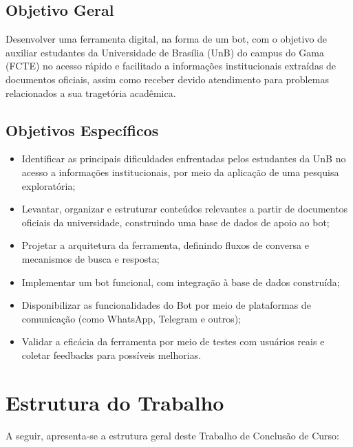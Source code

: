 \subsection{Objetivo Geral}

Desenvolver uma ferramenta digital, na forma de um bot, com o objetivo de auxiliar estudantes da Universidade de Brasília (UnB) do campus do Gama (FCTE) no acesso rápido e facilitado a informações institucionais extraídas de documentos oficiais, assim como receber devido atendimento para problemas relacionados a sua tragetória acadêmica.

\subsection{Objetivos Específicos}

\begin{itemize}
    \item Identificar as principais dificuldades enfrentadas pelos estudantes da UnB no acesso a informações institucionais, por meio da aplicação de uma pesquisa exploratória;
    
    \item Levantar, organizar e estruturar conteúdos relevantes a partir de documentos oficiais da universidade, construindo uma base de dados de apoio ao bot;
    
    \item Projetar a arquitetura da ferramenta, definindo fluxos de conversa e mecanismos de busca e resposta;
    
    \item Implementar um bot funcional, com integração à base de dados construída;
    
    \item Disponibilizar as funcionalidades do Bot por meio de plataformas de comunicação (como WhatsApp, Telegram e outros);
    
    \item Validar a eficácia da ferramenta por meio de testes com usuários reais e coletar feedbacks para possíveis melhorias.
\end{itemize}

\section{Estrutura do Trabalho}

A seguir, apresenta-se a estrutura geral deste Trabalho de Conclusão de Curso:

